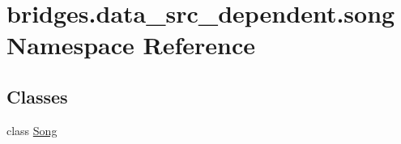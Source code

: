 \hypertarget{namespacebridges_1_1data__src__dependent_1_1song}{}\section{bridges.\+data\+\_\+src\+\_\+dependent.\+song Namespace Reference}
\label{namespacebridges_1_1data__src__dependent_1_1song}
\subsection*{Classes}
\begin{DoxyCompactItemize}
\item 
class \hyperlink{classbridges_1_1data__src__dependent_1_1song_1_1_song}{Song}
\end{DoxyCompactItemize}
